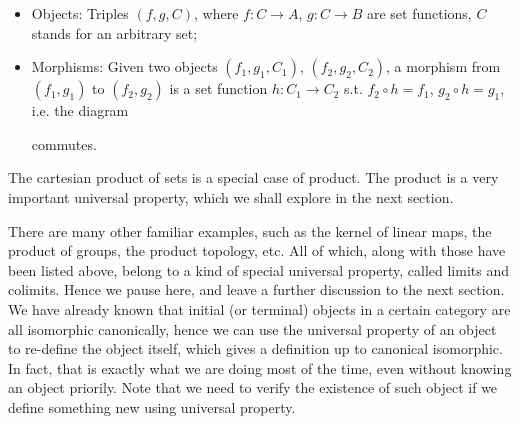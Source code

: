 \begin{example}
\begin{enumerate}[label=(\roman*)]
			\begin{itemize}
				\item Objects: Triples $(f,g,C)$, where $f:C\to A$, $g:C\to B$ are set functions, $C$ stands for an arbitrary set;
				\item Morphisms: Given two objects $(f_1,g_1,C_1)$, $(f_2,g_2,C_2)$, a morphism from $(f_1,g_1)$ to $(f_2,g_2)$ is a set function $h:C_1\to C_2$ s.t. $f_2\circ h=f_1$, $g_2\circ h=g_1$, i.e. the diagram
				commutes.
			\end{itemize}
	The cartesian product of sets is a special case of product. The product is a very important universal property, which we shall explore in the next section.
	\end{enumerate}
\end{example}
There are many other familiar examples, such as the kernel of linear maps, the product of groups, the product topology, etc. All of which, along with those have been listed above, belong to a kind of special universal property, called limits and colimits. Hence we pause here, and leave a further discussion to the next section. We have already known that initial (or terminal) objects in a certain category are all isomorphic canonically, hence we can use the universal property of an object to re-define the object itself, which gives a definition up to canonical isomorphic. In fact, that is exactly what we are doing most of the time, even without knowing an object priorily. Note that we need to verify the existence of such object if we define something new using universal property. 
